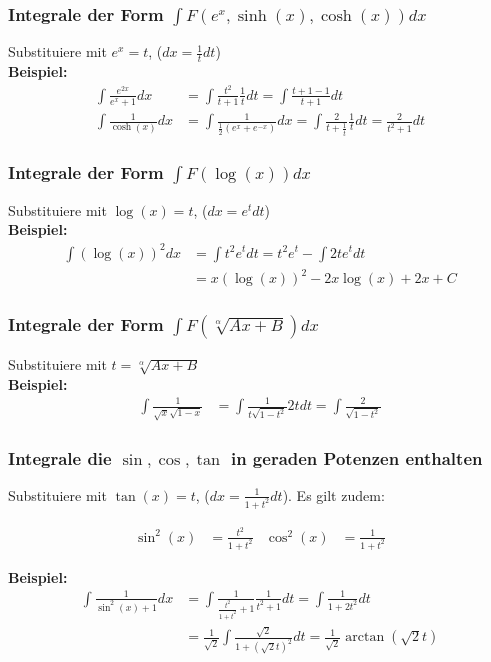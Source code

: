 \documentclass[25pt]{sciposter}
\begin{document}
\begin{multicols}{3}
\subsubsection*{Integrale der Form $\int F(e^x, \sinh(x), \cosh(x)) dx$}
Substituiere mit $e^x = t$, ($dx = \frac{1}{t} dt$)\\
\textbf{Beispiel:}
\begin{align*}
	\int \frac{e^{2x}}{e^x + 1} dx &= \int \frac{t^2}{t + 1 } \frac{1}{t} dt = \int\frac{t +1 - 1}{t+1} dt\\
	\int \frac{1}{\cosh(x)} dx &= \int \frac{1}{\frac{1}{2} (e^x + e^{-x})} dx = \int \frac{2}{t + \frac{1}{t}} \frac{1}{t} dt = \frac{2}{t^2 + 1} dt
\end{align*}

\subsubsection*{Integrale der Form $\int F(\log(x)) dx$}
Substituiere mit $\log(x) = t$, ($dx = e^t dt$)\\
\textbf{Beispiel:}
\begin{align*}
	\int (\log(x))^2 dx &= \int t^2 e^t dt = t^2 e^t - \int 2t e^t dt  \\
	&= x(\log(x))^2 -2x\log(x) + 2x + C
\end{align*}

\subsubsection*{Integrale der Form $\int F(\sqrt[\alpha]{Ax + B}) dx$}
Substituiere mit $t = \sqrt[\alpha]{Ax + B}$\\
\textbf{Beispiel:}
\begin{align*}
	\int \frac{1}{\sqrt{x} \sqrt{1-x}} &= \int \frac{1}{t \sqrt{1-t^2}} 2t dt = \int \frac{2}{\sqrt{1-t^2}}
\end{align*}

\subsubsection*{Integrale die $\sin, \cos, \tan$ in geraden Potenzen enthalten}
Substituiere mit $\tan(x) = t$, ($dx = \frac{1}{1+t^2} dt$). Es gilt zudem:

\begin{align*}
\sin^2(x) &= \frac{t^2}{1+t^2} & \cos^2(x) &= \frac{1}{1+t^2}
\end{align*}

\textbf{Beispiel:}
\begin{align*}
	\int \frac{1}{\sin^2(x) + 1} dx &= \int \frac{1}{\frac{t^2}{1+t^2} + 1} \frac{1}{t^2 + 1} dt = \int \frac{1}{1+2t^2} dt\\ &= \frac{1}{\sqrt{2}} \int  \frac{\sqrt{2}}{1 + (\sqrt{2}t)^2} dt = \frac{1}{\sqrt{2}} \arctan(\sqrt{2}t)
\end{align*}



\end{multicols}
\end{document}
